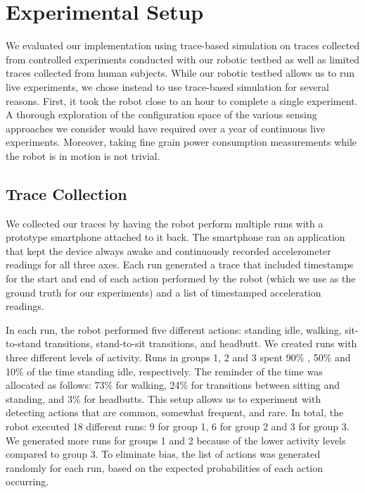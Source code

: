 \section{Experimental Setup}
\label{sec:experimentalSetup}

We evaluated our implementation using trace-based simulation on traces
collected from controlled experiments conducted with our robotic
testbed as well as limited traces collected from human subjects.
While our robotic testbed allows us to run live experiments, we chose
instead to use trace-based simulation for several reasons.  First, it
took the robot close to an hour to complete a single experiment.  A
thorough exploration of the configuration space of the various sensing
approaches we consider would have required over a year of continuous
live experiments.  Moreover, taking fine grain power consumption
measurements while the robot is in motion is not trivial.

\subsection{Trace Collection}

We collected our traces by having the robot perform multiple runs with
a prototype smartphone attached to it back.  The smartphone ran an
application that kept the device always awake and continuously recorded
accelerometer readings for all three axes.  Each run generated a
trace that included timestamps for the start and end of each action
performed by the robot (which we use as the ground truth for our
experiments) and a list of timestamped acceleration readings.

In each run, the robot performed five different actions: standing
idle, walking, sit-to-stand transitions, stand-to-sit transitions, and
headbutt.  We created runs with three different levels of activity.
Runs in groups 1, 2 and 3 spent 90\% , 50\% and 10\% of the time
standing idle, respectively. The reminder of the time was allocated as
follows: 73\% for walking, 24\% for transitions between sitting and
standing, and 3\% for headbutts.  This setup allows us to experiment
with detecting actions that are common, somewhat frequent, and rare.
In total, the robot executed 18 different runs: 9 for group 1, 6
for group 2 and 3 for group 3.  We generated more runs for groups 1
and 2 because of the lower activity levels compared to group 3. To
eliminate bias, the list of actions was generated randomly for each
run, based on the expected probabilities of each action occurring.

